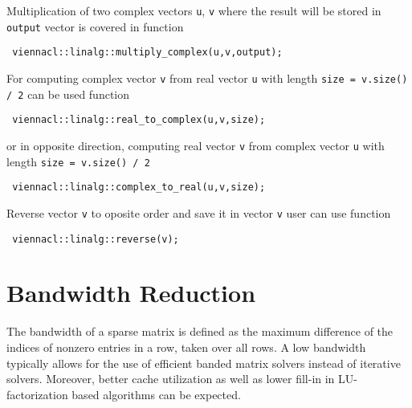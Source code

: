 
Multiplication of two complex vectors \lstinline|u|, \lstinline|v| where the result will be stored in \lstinline|output| vector is covered in function
\begin{lstlisting}
 viennacl::linalg::multiply_complex(u,v,output);
\end{lstlisting}

For computing complex vector \lstinline|v| from real vector \lstinline|u| with length \lstinline|size = v.size() / 2| can be used function
\begin{lstlisting}
 viennacl::linalg::real_to_complex(u,v,size);
\end{lstlisting}
or in opposite direction, computing real vector \lstinline|v| from complex vector \lstinline|u| with length \lstinline|size = v.size() / 2| 
\begin{lstlisting}
 viennacl::linalg::complex_to_real(u,v,size);
\end{lstlisting}

Reverse vector \lstinline|v| to oposite order and save it in vector \lstinline|v| user can use
function 
\begin{lstlisting}
 viennacl::linalg::reverse(v);
\end{lstlisting}

\section{Bandwidth Reduction} \label{sec:bandwidth-reduction}

The bandwidth of a sparse matrix is defined as the maximum difference of the indices of nonzero entries in a row, taken over all rows. A low bandwidth
typically allows for the use of efficient banded matrix solvers instead of iterative solvers. Moreover, better cache utilization as well as lower fill-in in
LU-factorization based algorithms can be expected.

